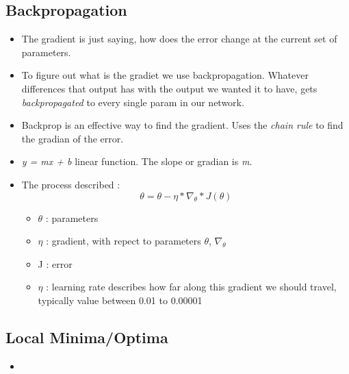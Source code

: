 \documentclass[12pt,a4paper]{article}
\begin{document}
\subsection{Backpropagation}
\begin{itemize}
\item  The gradient is just saying, how does the error change at the current set of parameters.
\item To figure out what is the gradiet we use backpropagation. Whatever differences that output has with the output we wanted it to have, gets \textit{backpropagated} to every single param in our network.
\item Backprop is an effective way to find the gradient. Uses the \textit{chain rule} to find the gradian of the error.
\item \textit{y = mx + b} linear function. The slope or gradian is \textit{m}.
\item The process described : 
\begin{equation} \theta = \theta - \eta * \nabla_\theta * J(\theta)
\end{equation}
\begin{itemize}
\item $\theta$ : parameters
\item $\eta$ : gradient, with repect to parameters $\theta$, $\nabla_\theta$
\item J : error
\item $\eta$ : learning rate describes how far along this gradient we should travel, typically value between 0.01 to 0.00001
\end{itemize}
\end{itemize}
\subsection{Local Minima/Optima}
\begin{itemize}
\item 
\end{itemize}
\end{document}
